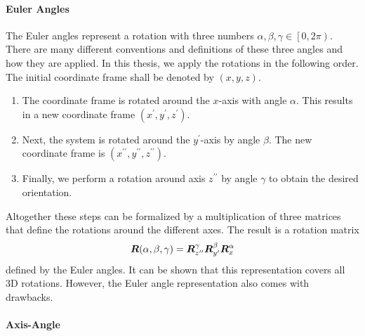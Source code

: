 		\paragraph{Euler Angles}
		The Euler angles represent a rotation with three numbers 
		$\alpha, \beta, \gamma \in \left[0, 2\pi\right)$.
		There are many different conventions and definitions of these three angles and how they are applied.
		In this thesis, we apply the rotations in the following order. 
		The initial coordinate frame shall be denoted by $(x, y, z)$.
		\begin{enumerate}
			\item The coordinate frame is rotated around the $x$-axis with angle $\alpha$. 
			This results in a new coordinate frame $(x^\prime, y^\prime, z^\prime)$.
			\item Next, the system is rotated around the $y^\prime$-axis by angle $\beta$. 
			The new coordinate frame is $(x^{\prime\prime}, y^{\prime\prime}, z^{\prime\prime})$.
			\item Finally, we perform a rotation around axis $z^{\prime\prime}$ by angle $\gamma$ to obtain the desired orientation.
		\end{enumerate}
		Altogether these steps can be formalized by a multiplication of three matrices that define the rotations around the different axes. 
		The result is a rotation matrix
		\begin{equation}
			\bm{R}(\alpha, \beta, \gamma) =
			\bm{R}_{z^{\prime\prime}}^\gamma
			\bm{R}_{y^\prime}^\beta
			\bm{R}_{x}^\alpha
		\end{equation}
		defined by the Euler angles. 
		It can be shown that this representation covers all 3D rotations. 
		However, the Euler angle representation also comes with drawbacks.
		
		
		\paragraph{Axis-Angle}
		
